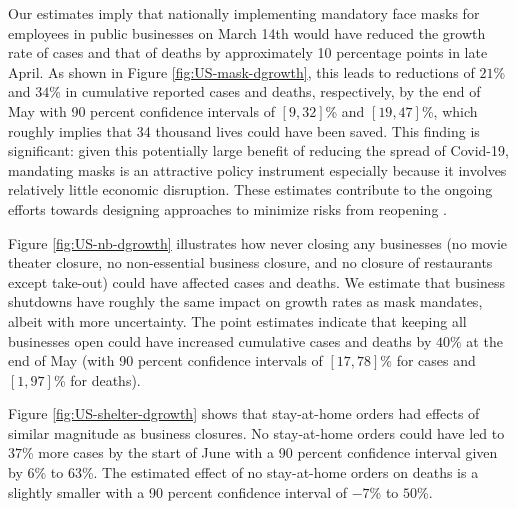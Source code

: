 \documentclass[11pt,reqno,letter]{amsart}
\theoremstyle{definition}
\begin{document}
Our estimates imply that nationally implementing mandatory face masks
for employees in public businesses on March 14th would have reduced the
growth rate of cases and that of deaths by approximately 10 percentage
points in late April. As shown in Figure \ref{fig:US-mask-dgrowth},
this leads to reductions of $21$\% and $34$\% in cumulative reported
cases and deaths, respectively, by the end of May with 90 percent
confidence intervals of $[9,32]$\% and $[19,47]$\%, which roughly
implies that 34 thousand lives could have been saved. %
This finding is
significant: given this potentially large benefit of reducing the
spread of Covid-19, mandating masks is an attractive policy instrument
especially because it involves relatively little economic
disruption. These estimates contribute to the ongoing efforts towards
designing approaches to minimize risks from reopening
\citep{stock2020b}.


Figure \ref{fig:US-nb-dgrowth} illustrates how never closing any
businesses (no movie theater closure, no non-essential business
closure, and no closure of restaurants except take-out) could have
affected cases and deaths.  We estimate that business shutdowns have 
roughly the same impact on growth rates as mask mandates, albeit with
more uncertainty. The point estimates indicate that keeping all
businesses open could have increased cumulative cases and deaths by
$40\%$ at the end of May (with 90 percent confidence intervals of
$[17,78]$\% for cases and $[1,97]$\% for deaths).

Figure \ref{fig:US-shelter-dgrowth} shows that stay-at-home orders had
effects of similar magnitude as business closures.  No stay-at-home
orders could have led to $37$\% more cases by the start of June with a
90 percent confidence interval given by $6$\% to $63$\%. The estimated
effect of no stay-at-home orders on deaths is a slightly smaller with
a 90 percent confidence interval of $-7$\% to $50$\%.  
\end{document}

